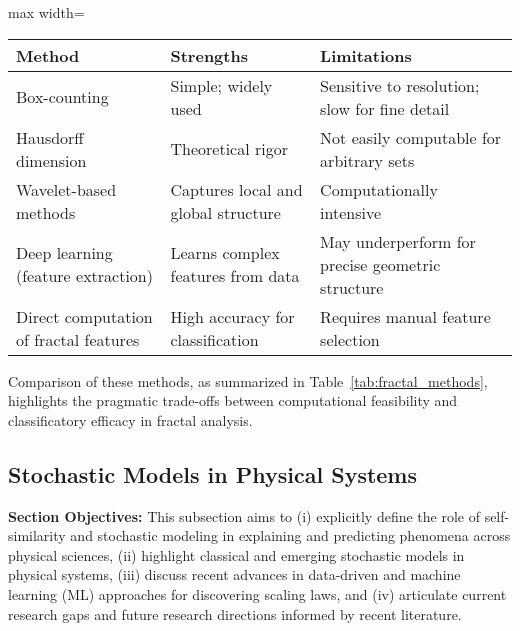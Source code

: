 \documentclass[sigconf]{acmart}
\begin{document}
\begin{table*}[htbp]
\centering
\caption{Selected Approaches to Fractal Dimension Estimation and Their Applicability}
\label{tab:fractal_methods}
\begin{adjustbox}{max width=\textwidth}
\begin{tabular}{lll}
\toprule
\textbf{Method}                 & \textbf{Strengths}                          & \textbf{Limitations}                    \\
\midrule
Box-counting                    & Simple; widely used                         & Sensitive to resolution; slow for fine detail \\
Hausdorff dimension             & Theoretical rigor                           & Not easily computable for arbitrary sets      \\
Wavelet-based methods           & Captures local and global structure         & Computationally intensive                      \\
Deep learning (feature extraction) & Learns complex features from data         & May underperform for precise geometric structure \\
Direct computation of fractal features & High accuracy for classification     & Requires manual feature selection                \\
\bottomrule
\end{tabular}
\end{adjustbox}
\end{table*}

Comparison of these methods, as summarized in Table~\ref{tab:fractal_methods}, highlights the pragmatic trade-offs between computational feasibility and classificatory efficacy in fractal analysis.

\subsection{Stochastic Models in Physical Systems}

\textbf{Section Objectives:} This subsection aims to (i) explicitly define the role of self-similarity and stochastic modeling in explaining and predicting phenomena across physical sciences, (ii) highlight classical and emerging stochastic models in physical systems, (iii) discuss recent advances in data-driven and machine learning (ML) approaches for discovering scaling laws, and (iv) articulate current research gaps and future research directions informed by recent literature.
\end{document}
